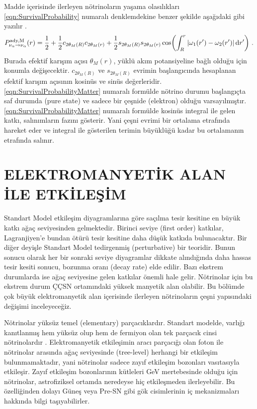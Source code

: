 Madde içerisinde ilerleyen nötrinoların yaşama olasılıkları \eqref{eqn:SurvivalProbability} numaralı denklemdekine benzer şekilde aşağıdaki gibi yazılır \cite{Giunti:2007ry}.
\begin{equation}\label{eqn:SurvivalProbabilityMatter}
    P^{\text{ady,M}}_{\nu_{\alpha}\rightarrow\nu_{\alpha}}(r)=\frac{1}{2} + \frac{1}{2} c_{2\theta_{M}(R)} c_{2\theta_{M}(r)} + \frac{1}{2} s_{2\theta_{M}(R)} s_{2\theta_{M}(r)} \cos(\int^{r}_{R} \abs{\omega_{1}(r')-\omega_{2}(r')} \dd{r'}) \text{ .}
\end{equation}
Burada efektif karışım açısı $ \theta_{M}(r) $, yüklü akım potansiyeline bağlı olduğu için konumla değişecektir. $ c_{2\theta_{M}(R)} $ ve $ s_{2\theta_{M}(R)} $ evrimin başlangıcında hesaplanan efektif karışım açısının kosinüs ve sinüs değerleridir. \eqref{eqn:SurvivalProbabilityMatter} numaralı formülde nötrino durumu başlangıçta saf durumda (pure state) ve sadece bir çeşnide (elektron) olduğu varsayılmıştır. \eqref{eqn:SurvivalProbabilityMatter} numaralı formülde kosinüs integral ile gelen katkı, salınımların fazını gösterir. Yani çeşni evrimi bir ortalama etrafında hareket eder ve integral ile gösterilen terimin büyüklüğü kadar bu ortalamanın etrafında salınır. 

\section{ELEKTROMANYETİK ALAN İLE ETKİLEŞİM}\label{sec:EMIleEtkilesim}
\paragraph{}
Standart Model etkileşim diyagramlarına göre saçılma tesir kesitine en büyük katkı ağaç seviyesinden gelmektedir. Birinci seviye (first order) katkılar, Lagranjiyen'e bundan ötürü tesir kesitine daha düşük katkıda bulunacaktır. Bir diğer deyişle Standart Model tedirgenmiş (perturbative) bir teoridir. Bunun sonucu olarak her bir sonraki seviye diyagramlar dikkate alındığında daha hassas tesir kesiti sonucu, bozunma oranı (decay rate) elde edilir. Bazı ekstrem durumlarda ise ağaç seviyesine gelen katkılar önemli hale gelir. Nötrinolar için bu ekstrem durum ÇÇSN ortamındaki yüksek manyetik alan olabilir. Bu bölümde çok büyük elektromanyetik alan içerisinde ilerleyen nötrinoların çeşni yapısındaki değişimi inceleyeceğiz. 

Nötrinolar yüksüz temel (elementary) parçacıklardır. Standart modelde, varlığı kanıtlanmış hem yüksüz olup hem de fermiyon olan tek parçacık cinsi nötrinolardır \cite{ParticleDataGroup:2018ovx}. Elektromanyetik etkileşimin aracı parçacığı olan foton ile nötrinolar arasında ağaç seviyesinde (tree-level) herhangi bir etkileşim bulunmamaktadır, yani nötrinolar sadece zayıf etkileşim bozonları vasıtasıyla etkileşir. Zayıf etkileşim bozonlarının kütleleri GeV mertebesinde olduğu için nötrinolar, astrofiziksel ortamda neredeyse hiç etkileşmeden ilerleyebilir. Bu özelliğinden dolayı Güneş veya Pre-SN gibi gök cisimlerinin iç mekanizmaları hakkında bilgi taşıyabilirler.

